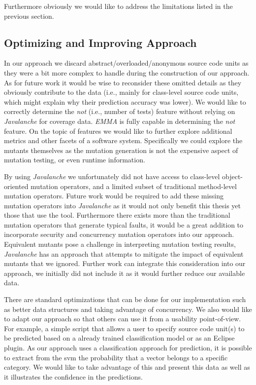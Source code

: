 Furthermore obviously we would like to address the limitations listed in the previous section.


\subsection{Optimizing and Improving Approach}
\label{subsec:conclusions_optimizing_approach}
In our approach we discard abstract/overloaded/anonymous source code units as they were a bit more complex to handle during the construction of our approach. As for future work it would be wise to reconsider these omitted details as they obviously contribute to the data (i.e., mainly for class-level source code units, which might explain why their prediction accuracy was lower). We would like to correctly determine the \emph{not} (i.e., number of tests) feature without relying on \emph{Javalanche} for coverage data. \emph{EMMA} is fully capable in determining the \emph{not} feature. On the topic of features we would like to further explore additional metrics and other facets of a software system. Specifically we could explore the mutants themselves as the mutation generation is not the expensive aspect of mutation testing, or even runtime information.

By using \emph{Javalanche} we unfortunately did not have access to class-level object-oriented mutation operators, and a limited subset of traditional method-level mutation operators. Future work would be required to add these missing mutation operators into \emph{Javalanche} as it would not only benefit this thesis yet those that use the tool. Furthermore there exists more than the traditional mutation operators that generate typical faults, it would be a great addition to incorporate security and concurrency mutation operators into our approach. Equivalent mutants pose a challenge in interpreting mutation testing results, \emph{Javalanche} has an approach that attempts to mitigate the impact of equivalent mutants that we ignored. Further work can integrate this consideration into our approach, we initially did not include it as it would further reduce our available data.

There are standard optimizations that can be done for our implementation such as better data structures and taking advantage of concurrency. We also would like to adapt our approach so that others can use it from a usability point-of-view. For example, a simple script that allows a user to specify source code unit(s) to be predicted based on a already trained classification model or as an Eclipse plugin. As our approach uses a classification approach for prediction, it is possible to extract from the \gls{svm} the probability that a vector belongs to a specific category. We would like to take advantage of this and present this data as well as it illustrates the confidence in the predictions.


